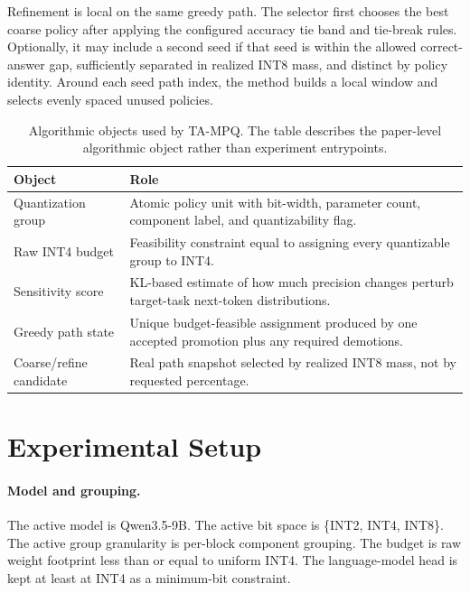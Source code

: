 \documentclass{article}
\newcommand{\method}{TA-MPQ}
\newcommand{\inttwo}{INT2}
\newcommand{\intfour}{INT4}
\newcommand{\inteight}{INT8}
\begin{document}
Refinement is local on the same greedy path. The selector first chooses the best coarse policy after applying the configured accuracy tie band and tie-break rules. Optionally, it may include a second seed if that seed is within the allowed correct-answer gap, sufficiently separated in realized \inteight{} mass, and distinct by policy identity. Around each seed path index, the method builds a local window and selects evenly spaced unused policies.

\begin{table}[t]
\caption{Algorithmic objects used by \method{}. The table describes the paper-level algorithmic object rather than experiment entrypoints.}
\label{tab:algorithmic-objects}
\centering
\begin{tabular}{p{}p{}}
\toprule
Object & Role \\
\midrule
Quantization group & Atomic policy unit with bit-width, parameter count, component label, and quantizability flag. \\
Raw \intfour{} budget & Feasibility constraint equal to assigning every quantizable group to \intfour{}. \\
Sensitivity score & KL-based estimate of how much precision changes perturb target-task next-token distributions. \\
Greedy path state & Unique budget-feasible assignment produced by one accepted promotion plus any required demotions. \\
Coarse/refine candidate & Real path snapshot selected by realized \inteight{} mass, not by requested percentage. \\
\bottomrule
\end{tabular}
\end{table}

\section{Experimental Setup}

\paragraph{Model and grouping.}
The active model is Qwen3.5-9B. The active bit space is \{\inttwo{}, \intfour{}, \inteight{}\}. The active group granularity is per-block component grouping. The budget is raw weight footprint less than or equal to uniform \intfour{}. The language-model head is kept at least at \intfour{} as a minimum-bit constraint.
\end{document}
